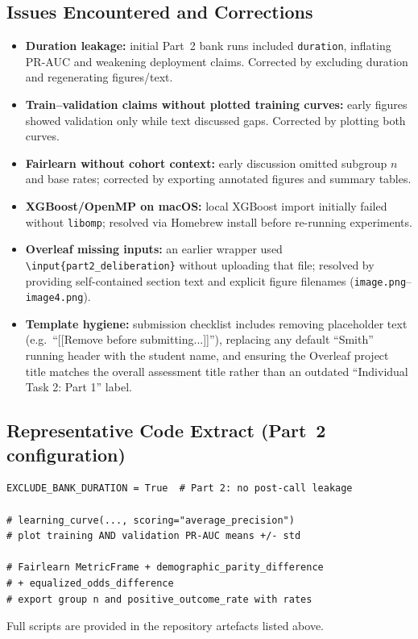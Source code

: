 \subsection{Issues Encountered and Corrections}
\begin{itemize}
    \item \textbf{Duration leakage:} initial Part~2 bank runs included \texttt{duration},
    inflating PR-AUC and weakening deployment claims. Corrected by excluding duration and
    regenerating figures/text.
    \item \textbf{Train--validation claims without plotted training curves:} early figures
    showed validation only while text discussed gaps. Corrected by plotting both curves.
    \item \textbf{Fairlearn without cohort context:} early discussion omitted subgroup $n$
    and base rates; corrected by exporting annotated figures and summary tables.
    \item \textbf{XGBoost/OpenMP on macOS:} local XGBoost import initially failed without
    \texttt{libomp}; resolved via Homebrew install before re-running experiments.
    \item \textbf{Overleaf missing inputs:} an earlier wrapper used
    \texttt{\textbackslash input\{part2\_deliberation\}} without uploading that file;
    resolved by providing self-contained section text and explicit figure filenames
    (\texttt{image.png}--\texttt{image4.png}).
    \item \textbf{Template hygiene:} submission checklist includes removing placeholder
    text (e.g.\ ``[[Remove before submitting...]]''), replacing any default ``Smith''
    running header with the student name, and ensuring the Overleaf project title matches
    the overall assessment title rather than an outdated ``Individual Task 2: Part 1''
    label.
\end{itemize}

\subsection{Representative Code Extract (Part~2 configuration)}
\begin{verbatim}
EXCLUDE_BANK_DURATION = True  # Part 2: no post-call leakage

# learning_curve(..., scoring="average_precision")
# plot training AND validation PR-AUC means +/- std

# Fairlearn MetricFrame + demographic_parity_difference
# + equalized_odds_difference
# export group n and positive_outcome_rate with rates
\end{verbatim}
Full scripts are provided in the repository artefacts listed above.
